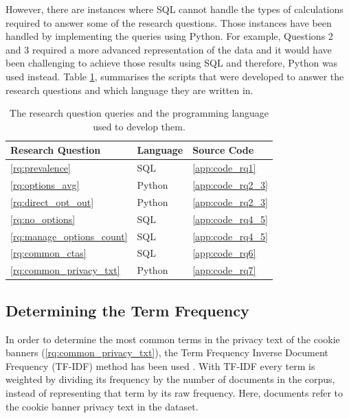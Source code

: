\documentclass[../main.tex]{subfiles}
\begin{document}
However, there are instances where SQL cannot handle the types of calculations required to answer some of the research questions. Those instances have been handled by implementing the queries using Python. For example, Questions 2 and 3 required a more advanced representation of the data and it would have been challenging to achieve those results using SQL and therefore, Python was used instead. Table \ref{tab:impl_rqs_sc}, summarises the scripts that were developed to answer the research questions and which language they are written in. 

\begin{table}[ht]
    \centering
    \begin{tabular}{@{}lll@{}}
    \toprule
        \textbf{Research Question}      & \textbf{Language} & \textbf{Source Code}  \\ \midrule
        \ref{rq:prevalence}             & SQL               & \ref{app:code_rq1}    \\
        \ref{rq:options_avg}            & Python            & \ref{app:code_rq2_3}    \\
        \ref{rq:direct_opt_out}         & Python            & \ref{app:code_rq2_3}    \\
        \ref{rq:no_options}             & SQL               & \ref{app:code_rq4_5}    \\
        \ref{rq:manage_options_count}   & SQL               & \ref{app:code_rq4_5}    \\
        \ref{rq:common_ctas}            & SQL               & \ref{app:code_rq6}    \\
        \ref{rq:common_privacy_txt}     & Python            & \ref{app:code_rq7}    \\ \bottomrule
    \end{tabular}
    \caption{The research question queries and the programming language used to develop them.}
    \label{tab:impl_rqs_sc}
\end{table}

\subsection{Determining the Term Frequency}
In order to determine the most common terms in the privacy text of the cookie banners (\ref{rq:common_privacy_txt}), the Term Frequency Inverse Document Frequency (TF-IDF) method has been used \cite{jones1972statistical, ramos2003using}. With TF-IDF every term is weighted by dividing its frequency by the number of documents in the corpus, instead of representing that term by its raw frequency. Here, documents refer to the cookie banner privacy text in the dataset.
\end{document}
